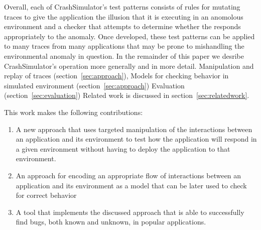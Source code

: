 Overall, each of CrashSimulator's test patterns consists of rules for mutating traces to give the application the
illusion that it is executing in an anomolous environment and a checker 
that attempts to determine whether the responds appropriately to the anomaly.
Once developed, these test patterns can be applied to many traces from many applications that may be prone to mishandling the environmental anomaly in question.
In the remainder of this paper we desribe CrashSimulator's operation more generally and in more detail.
Manipulation and replay of traces (section~\ref{sec:approach}),
Models for checking behavior in simulated environment (section~\ref{sec:approach})
Evaluation (section~\ref{sec:evaluation})
Related work is discussed in section~\ref{sec:relatedwork}.

		This work makes the following contributions:

    \begin{enumerate}
        \item{A new approach that uses targeted manipulation of the interactions between an application and its
            environment to test how the application will respond in a given environment without having to deploy
            the application to that environment.}
        \item{An approach for encoding an appropriate flow of interactions between an application and its environment as
            a model that can be later used to check for correct behavior}
        \item{A tool that implements the discussed approach that is able to successfully find bugs, both known and
            unknown, in popular applications.}
    \end{enumerate}


